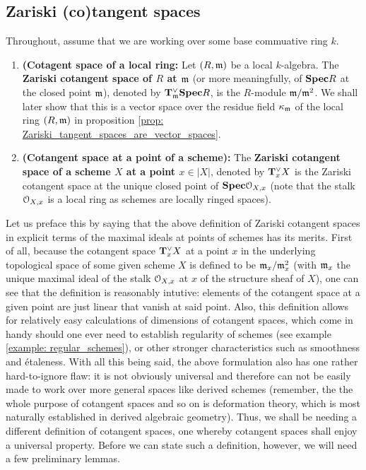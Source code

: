         \subsection{Zariski (co)tangent spaces}
            \begin{definition} \label{def: zariski_tangent_spaces} 
                Throughout, assume that we are working over some base commuative ring $k$. 
                \begin{enumerate}
                    \item \textbf{(Cotagent space of a local ring:} Let $(R, \mathfrak{m})$ be a local $k$-algebra. The \textbf{Zariski cotangent space of $R$ at $\mathfrak{m}$} (or more meaningfully, of $\mathbf{Spec} R$ at the closed point $\mathfrak{m}$), denoted by $\mathbf{T}^{\vee}_{\mathfrak{m}}\mathbf{Spec} R$, is the $R$-module $\mathfrak{m}/\mathfrak{m}^2$. We shall later show that this is a vector space over the residue field $\kappa_{\mathfrak{m}}$ of the local ring $(R, \mathfrak{m})$ in proposition \ref{prop: Zariski_tangent_spaces_are_vector_spaces}.   
                    \item \textbf{(Cotangent space at a point of a scheme):} The \textbf{Zariski cotangent space of a scheme $X$ at a point $x \in |X|$}, denoted by $\mathbf{T}^{\vee}_xX$ is the Zariski cotangent space at the unique closed point of $\mathbf{Spec} \mathcal{O}_{X, x}$ (note that the stalk $\mathcal{O}_{X, x}$ is a local ring as schemes are locally ringed spaces).
                \end{enumerate}
            \end{definition}
            \begin{remark}
                Let us preface this by saying that the above definition of Zariski cotangent spaces in explicit terms of the maximal ideals at points of schemes has its merits. First of all, because the cotangent space $\mathbf{T}^{\vee}_xX$ at a point $x$ in the underlying topological space of some given scheme $X$ is defined to be $\mathfrak{m}_x/\mathfrak{m}_x^2$ (with $\mathfrak{m}_x$ the unique maximal ideal of the stalk $\mathcal{O}_{X, x}$ at $x$ of the structure sheaf of $X$), one can see that the definition is reasonably intutive: elements of the cotangent space at a given point are just linear  that vanish at said point. Also, this definition allows for relatively easy calculations of dimensions of cotangent spaces, which come in handy should one ever need to establish regularity of schemes (see example \ref{example: regular_schemes}), or other stronger characteristics such as smoothness and \'etaleness. With all this being said, the above formulation also has one rather hard-to-ignore flaw: it is not obviously universal and therefore can not be easily made to work over more general spaces like derived schemes (remember, the the whole purpose of cotangent spaces and so on is deformation theory, which is most naturally established in derived algebraic geometry). Thus, we shall be needing a different definition of cotangent spaces, one whereby cotangent spaces shall enjoy a universal property. Before we can state such a definition, however, we will need a few preliminary lemmas.
            \end{remark}
            
